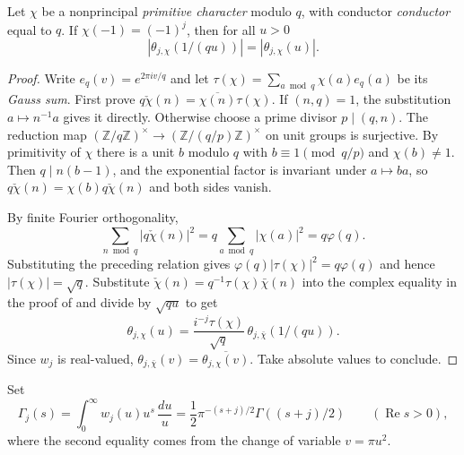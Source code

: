 \begin{lemma}
\label{lem:theta-primitive-symmetry}
\emitthmsource
Let $\chi$ be a nonprincipal \emph{primitive character} modulo $q$, with conductor \emph{conductor} equal to $q$. If $\chi(-1)=(-1)^j$, then for all $u>0$
\[
 |\theta_{j,\chi}(1/(qu))|=|\theta_{j,\chi}(u)|.
\]
\end{lemma}
\begin{proof}
Write $e_q(v)=e^{2\pi iv/q}$ and let $\tau(\chi)=\sum_{a\bmod q}\chi(a)e_q(a)$ be its \emph{Gauss sum}.
First prove $q\check\chi(n)=\overline{\chi(n)}\tau(\chi)$. If $(n,q)=1$, the substitution $a\mapsto n^{-1}a$ gives it directly.
Otherwise choose a prime divisor $p\mid(q,n)$. The reduction map $(\mathbb Z/q\mathbb Z)^\times\to(\mathbb Z/(q/p)\mathbb Z)^\times$ on unit groups is surjective. By primitivity of $\chi$ there is a unit $b$ modulo $q$
with $b\equiv1\pmod{q/p}$ and $\chi(b)\ne1$. Then $q\mid n(b-1)$, and the exponential factor is invariant under $a\mapsto ba$,
so $q\check\chi(n)=\chi(b)q\check\chi(n)$ and both sides vanish.

By finite Fourier orthogonality,
\[
 \sum_{n\bmod q}|q\check\chi(n)|^2=q\sum_{a\bmod q}|\chi(a)|^2=q\varphi(q).
\]
Substituting the preceding relation gives $\varphi(q)|\tau(\chi)|^2=q\varphi(q)$ and hence $|\tau(\chi)|=\sqrt q$.
Substitute $\check\chi(n)=q^{-1}\tau(\chi)\bar\chi(n)$ into the complex equality in the proof of 
and divide by $\sqrt{qu}$ to get
\[
 \theta_{j,\chi}(u)=\frac{i^{-j}\tau(\chi)}{\sqrt q}\,
                         \theta_{j,\bar\chi}(1/(qu)).
\]
Since $w_j$ is real-valued, $\theta_{j,\bar\chi}(v)=\overline{\theta_{j,\chi}(v)}$. Take absolute values to conclude.
\end{proof}

Set
\[
 \Gamma_j(s)=\int_0^\infty w_j(u)u^s\,\frac{du}{u}
              =\frac12\pi^{-(s+j)/2}\Gamma((s+j)/2)
 \qquad(\operatorname{Re}s>0),
\]
where the second equality comes from the change of variable $v=\pi u^2$.


